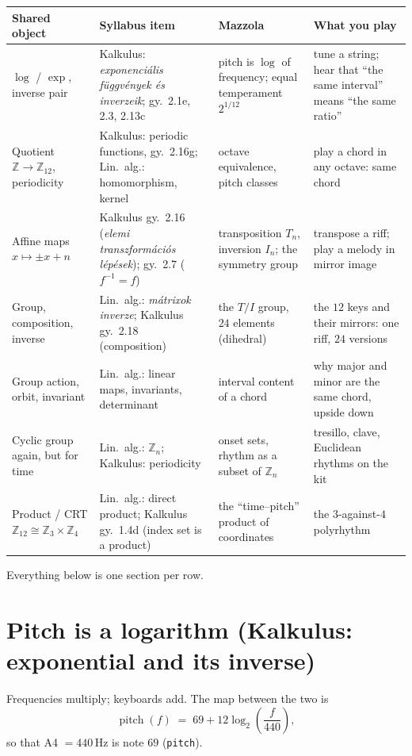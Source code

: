 \documentclass[11pt,a4paper]{article}
\newcommand{\Z}{\mathbb{Z}}
\newcommand{\Ztw}{\Z_{12}}
\newcommand{\lean}[1]{\texttt{#1}}
\begin{document}
\begin{longtable}{@{}p{3.1cm}p{3.9cm}p{3.6cm}p{4.4cm}@{}}
\toprule
\textbf{Shared object} & \textbf{Syllabus item} & \textbf{Mazzola} & \textbf{What you play}\\
\midrule
\endhead
$\log$ / $\exp$, inverse pair
 & Kalkulus: \emph{exponenciális függvények és inverzeik}; gy.\ 2.1e, 2.3, 2.13c
 & pitch is $\log$ of frequency; equal temperament $2^{1/12}$
 & tune a string; hear that ``the same interval'' means ``the same ratio''\\
Quotient $\Z\to\Ztw$, periodicity
 & Kalkulus: periodic functions, gy.\ 2.16g; Lin.\ alg.: homomorphism, kernel
 & octave equivalence, pitch classes
 & play a chord in any octave: same chord\\
Affine maps $x\mapsto \pm x+n$
 & Kalkulus gy.\ 2.16 (\emph{elemi transzformációs lépések}); gy.\ 2.7 ($f^{-1}=f$)
 & transposition $T_n$, inversion $I_n$; the symmetry group
 & transpose a riff; play a melody in mirror image\\
Group, composition, inverse
 & Lin.\ alg.: \emph{mátrixok inverze}; Kalkulus gy.\ 2.18 (composition)
 & the $T/I$ group, $24$ elements (dihedral)
 & the $12$ keys and their mirrors: one riff, $24$ versions\\
Group action, orbit, invariant
 & Lin.\ alg.: linear maps, invariants, determinant
 & interval content of a chord
 & why major and minor are the same chord, upside down\\
Cyclic group again, but for time
 & Lin.\ alg.: $\Z_n$; Kalkulus: periodicity
 & onset sets, rhythm as a subset of $\Z_n$
 & tresillo, clave, Euclidean rhythms on the kit\\
Product / CRT $\Ztw\cong\Z_3\times\Z_4$
 & Lin.\ alg.: direct product; Kalkulus gy.\ 1.4d (index set is a product)
 & the ``time--pitch'' product of coordinates
 & the $3$-against-$4$ polyrhythm\\
\bottomrule
\end{longtable}

\noindent
Everything below is one section per row.

\section{Pitch is a logarithm (Kalkulus: exponential and its inverse)}

Frequencies multiply; keyboards add. The map between the two is
\[
  \operatorname{pitch}(f) \;=\; 69 + 12\log_2\!\left(\frac{f}{440}\right),
\]
so that A4 $=440$\,Hz is note $69$ (\lean{pitch}).
\end{document}
